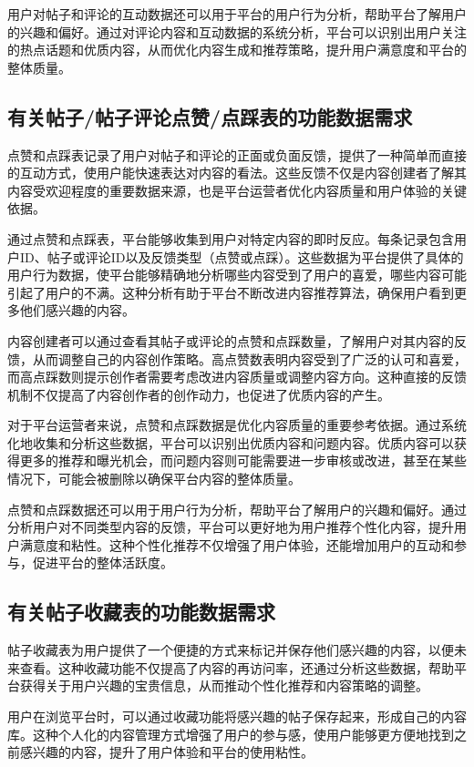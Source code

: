 用户对帖子和评论的互动数据还可以用于平台的用户行为分析，帮助平台了解用户的兴趣和偏好。通过对评论内容和互动数据的系统分析，平台可以识别出用户关注的热点话题和优质内容，从而优化内容生成和推荐策略，提升用户满意度和平台的整体质量。

\subsection{有关帖子/帖子评论点赞/点踩表的功能数据需求}

点赞和点踩表记录了用户对帖子和评论的正面或负面反馈，提供了一种简单而直接的互动方式，使用户能快速表达对内容的看法。这些反馈不仅是内容创建者了解其内容受欢迎程度的重要数据来源，也是平台运营者优化内容质量和用户体验的关键依据。

通过点赞和点踩表，平台能够收集到用户对特定内容的即时反应。每条记录包含用户ID、帖子或评论ID以及反馈类型（点赞或点踩）。这些数据为平台提供了具体的用户行为数据，使平台能够精确地分析哪些内容受到了用户的喜爱，哪些内容可能引起了用户的不满。这种分析有助于平台不断改进内容推荐算法，确保用户看到更多他们感兴趣的内容。

内容创建者可以通过查看其帖子或评论的点赞和点踩数量，了解用户对其内容的反馈，从而调整自己的内容创作策略。高点赞数表明内容受到了广泛的认可和喜爱，而高点踩数则提示创作者需要考虑改进内容质量或调整内容方向。这种直接的反馈机制不仅提高了内容创作者的创作动力，也促进了优质内容的产生。

对于平台运营者来说，点赞和点踩数据是优化内容质量的重要参考依据。通过系统化地收集和分析这些数据，平台可以识别出优质内容和问题内容。优质内容可以获得更多的推荐和曝光机会，而问题内容则可能需要进一步审核或改进，甚至在某些情况下，可能会被删除以确保平台内容的整体质量。

点赞和点踩数据还可以用于用户行为分析，帮助平台了解用户的兴趣和偏好。通过分析用户对不同类型内容的反馈，平台可以更好地为用户推荐个性化内容，提升用户满意度和粘性。这种个性化推荐不仅增强了用户体验，还能增加用户的互动和参与，促进平台的整体活跃度。

\subsection{有关帖子收藏表的功能数据需求}

帖子收藏表为用户提供了一个便捷的方式来标记并保存他们感兴趣的内容，以便未来查看。这种收藏功能不仅提高了内容的再访问率，还通过分析这些数据，帮助平台获得关于用户兴趣的宝贵信息，从而推动个性化推荐和内容策略的调整。

用户在浏览平台时，可以通过收藏功能将感兴趣的帖子保存起来，形成自己的内容库。这种个人化的内容管理方式增强了用户的参与感，使用户能够更方便地找到之前感兴趣的内容，提升了用户体验和平台的使用粘性。

